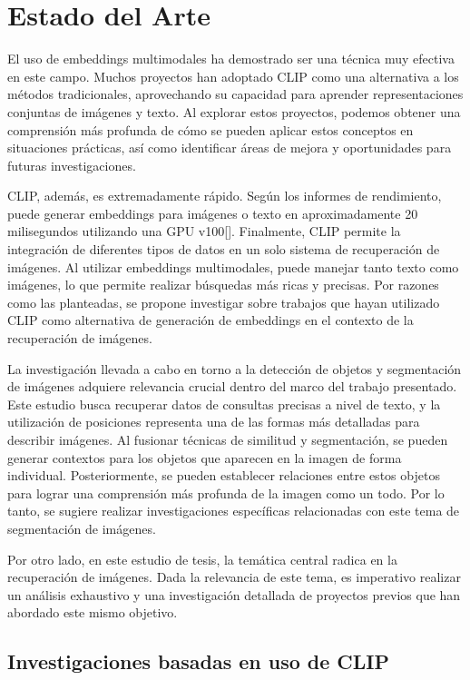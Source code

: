 \chapter{Estado del Arte}\label{chapter:state-of-the-art}

El uso de embeddings multimodales ha demostrado ser una técnica muy efectiva en este campo. Muchos proyectos han adoptado CLIP como una alternativa a los métodos tradicionales, aprovechando su capacidad para aprender representaciones conjuntas de imágenes y texto. Al explorar estos proyectos, podemos obtener una comprensión más profunda de cómo se pueden aplicar estos conceptos en situaciones prácticas, así como identificar áreas de mejora y oportunidades para futuras investigaciones.

CLIP, además, es extremadamente rápido. Según los informes de rendimiento, puede generar embeddings para imágenes o texto en aproximadamente 20 milisegundos utilizando una GPU v100[\cite{BuildingImageClip-20ms}]. Finalmente, CLIP permite la integración de diferentes tipos de datos en un solo sistema de recuperación de imágenes. Al utilizar embeddings multimodales, puede manejar tanto texto como imágenes, lo que permite realizar búsquedas más ricas y precisas. Por razones como las planteadas, se propone investigar sobre trabajos que hayan utilizado CLIP como alternativa de generación de embeddings en el contexto de la recuperación de imágenes.

La investigación llevada a cabo en torno a la detección de objetos y segmentación de imágenes adquiere relevancia crucial dentro del marco del trabajo presentado. Este estudio busca recuperar datos de consultas precisas a nivel de texto, y la utilización de posiciones representa una de las formas más detalladas para describir imágenes. Al fusionar técnicas de similitud y segmentación, se pueden generar contextos para los objetos que aparecen en la imagen de forma individual. Posteriormente, se pueden establecer relaciones entre estos objetos para lograr una comprensión más profunda de la imagen como un todo. Por lo tanto, se sugiere realizar investigaciones específicas relacionadas con este tema de segmentación de imágenes.

Por otro lado, en este estudio de tesis, la temática central radica en la recuperación de imágenes. Dada la relevancia de este tema, es imperativo realizar un análisis exhaustivo y una investigación detallada de proyectos previos que han abordado este mismo objetivo.


\section{Investigaciones basadas en uso de CLIP}


